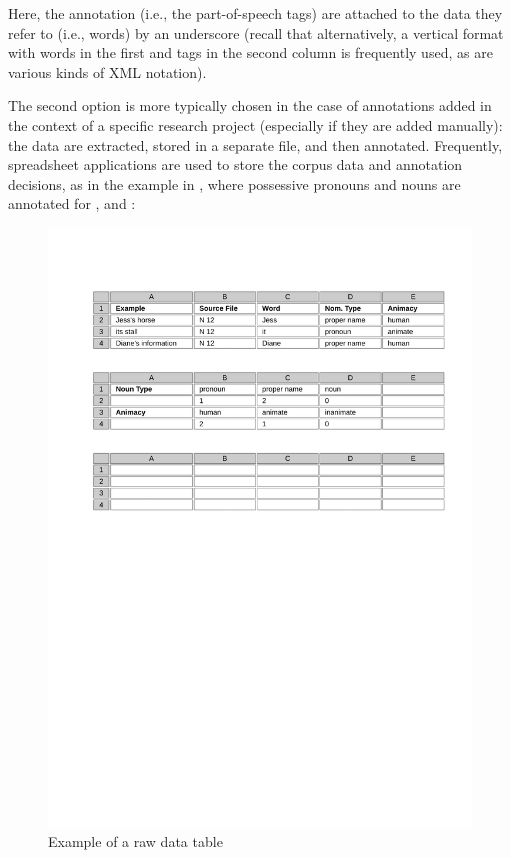 Here, the annotation  (i.e., the part\hyp{}of\hyp{}speech tags) are attached to the data they refer to (i.e., words) by an underscore (recall that alternatively, a vertical format with words in the first and tags in the second column is frequently used, as are various kinds of XML notation).

The second option is more typically chosen in the case of annotations added in the context of a specific research project (especially if they are added manually): the data are extracted,  stored  in a separate file, and then annotated.  Frequently, spreadsheet applications are used to store the corpus data and annotation decisions, as in the example in , where possessive  pronouns  and nouns  are annotated for ,   and :

\begin{figure}
\caption{Example of a raw data table}
\label{fig:storingdataright}
\includegraphics[width=\textwidth,keepaspectratio]{figures/storingdataright}
\end{figure}

